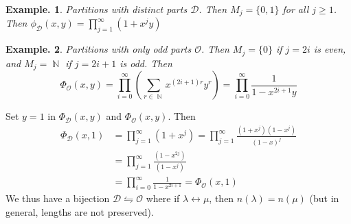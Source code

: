 \documentclass[11pt, a4paper]{memoir}
\DeclareMathOperator{\N}{{\mathbb{N}}}
\theoremstyle{change}
\theoremstyle{plain}
\theoremstyle{nonumberplain}
\newtheorem{example}{Example.}
\numberwithin{equation}{section}
\begin{document}
\begin{example}
    Partitions with distinct parts $\mathcal{D}$.
    Then $M_j=\{0,1\}$ for all $j\geq 1$.
    Then $\phi_{\mathcal{D}}(x,y)=\prod_{j=1}^\infty(1+x^jy)$
\end{example}
\begin{example}
    Partitions with only odd parts $\mathcal{O}$.
    Then $M_j=\{0\}$ if $j=2i$ is even, and $M_j=\N$ if $j=2i+1$ is odd.
    Then
    \begin{equation*}
        \Phi_{\mathcal{O}}(x,y)=\prod_{i=0}^\infty\left(\sum_{r\in\N}x^{(2i+1)r}y^r\right)=\prod_{i=0}^\infty\frac{1}{1-x^{2i+1}y}
    \end{equation*}
\end{example}
Set $y=1$ in $\Phi_{\mathcal{D}}(x,y)$ and $\Phi_{\mathcal{O}}(x,y)$.
Then
\begin{align*}
    \Phi_{\mathcal{D}}(x,1)&=\prod_{j=1}^\infty(1+x^j)=\prod_{j=1}^\infty\frac{(1+x^j)(1-x^j)}{(1-x)^j}\\
                           &= \prod_{j=1}^\infty\frac{(1-x^{2j})}{(1-x^j)}\\
                           &= \prod_{i=0}^\infty\frac{1}{1-x^{2i+1}}=\Phi_{\mathcal{O}}(x,1)
\end{align*}
We thus have a bijection $\mathcal{D}\leftrightharpoons\mathcal{O}$ where if $\lambda\leftrightarrow\mu$, then $n(\lambda)=n(\mu)$ (but in general, lengths are not preserved).
\end{document}
